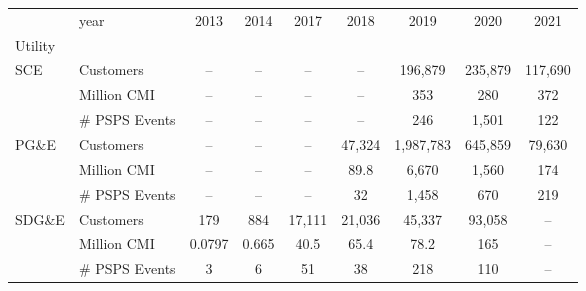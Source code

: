 \begin{tabular}{llccccccc}
\toprule
       & year &    2013 &   2014 &    2017 &    2018 &       2019 &     2020 &     2021 \\
Utility & \  &         &        &         &         &            &          &          \\
\midrule
\multirow{3}{*}{SCE} & Customers &      -- &     -- &      -- &      -- &    196,879 &  235,879 &  117,690 \\
       & Million CMI &      -- &     -- &      -- &      -- &        353 &      280 &      372 \\
       & \# PSPS Events &      -- &     -- &      -- &      -- &        246 &    1,501 &      122 \\
\cline{1-9}
\multirow{3}{*}{PG\&E} & Customers &      -- &     -- &      -- &  47,324 &  1,987,783 &  645,859 &   79,630 \\
       & Million CMI &      -- &     -- &      -- &    89.8 &      6,670 &    1,560 &      174 \\
       & \# PSPS Events &      -- &     -- &      -- &      32 &      1,458 &      670 &      219 \\
\cline{1-9}
\multirow{3}{*}{SDG\&E} & Customers &     179 &    884 &  17,111 &  21,036 &     45,337 &   93,058 &       -- \\
       & Million CMI &  0.0797 &  0.665 &    40.5 &    65.4 &       78.2 &      165 &       -- \\
       & \# PSPS Events &       3 &      6 &      51 &      38 &        218 &      110 &       -- \\
\bottomrule
\end{tabular}
